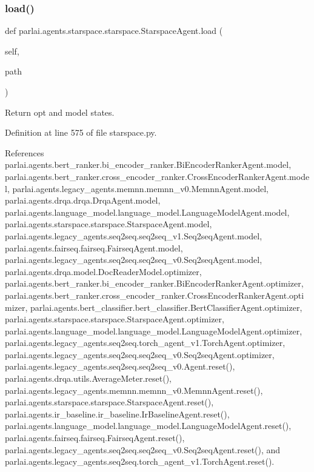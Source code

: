 \subsubsection{\texorpdfstring{load()}{load()}}
{\footnotesize\ttfamily def parlai.\+agents.\+starspace.\+starspace.\+Starspace\+Agent.\+load (\begin{DoxyParamCaption}\item[{}]{self,  }\item[{}]{path }\end{DoxyParamCaption})}

\begin{DoxyVerb}Return opt and model states.\end{DoxyVerb}
 

Definition at line 575 of file starspace.\+py.



References parlai.\+agents.\+bert\+\_\+ranker.\+bi\+\_\+encoder\+\_\+ranker.\+Bi\+Encoder\+Ranker\+Agent.\+model, parlai.\+agents.\+bert\+\_\+ranker.\+cross\+\_\+encoder\+\_\+ranker.\+Cross\+Encoder\+Ranker\+Agent.\+model, parlai.\+agents.\+legacy\+\_\+agents.\+memnn.\+memnn\+\_\+v0.\+Memnn\+Agent.\+model, parlai.\+agents.\+drqa.\+drqa.\+Drqa\+Agent.\+model, parlai.\+agents.\+language\+\_\+model.\+language\+\_\+model.\+Language\+Model\+Agent.\+model, parlai.\+agents.\+starspace.\+starspace.\+Starspace\+Agent.\+model, parlai.\+agents.\+legacy\+\_\+agents.\+seq2seq.\+seq2seq\+\_\+v1.\+Seq2seq\+Agent.\+model, parlai.\+agents.\+fairseq.\+fairseq.\+Fairseq\+Agent.\+model, parlai.\+agents.\+legacy\+\_\+agents.\+seq2seq.\+seq2seq\+\_\+v0.\+Seq2seq\+Agent.\+model, parlai.\+agents.\+drqa.\+model.\+Doc\+Reader\+Model.\+optimizer, parlai.\+agents.\+bert\+\_\+ranker.\+bi\+\_\+encoder\+\_\+ranker.\+Bi\+Encoder\+Ranker\+Agent.\+optimizer, parlai.\+agents.\+bert\+\_\+ranker.\+cross\+\_\+encoder\+\_\+ranker.\+Cross\+Encoder\+Ranker\+Agent.\+optimizer, parlai.\+agents.\+bert\+\_\+classifier.\+bert\+\_\+classifier.\+Bert\+Classifier\+Agent.\+optimizer, parlai.\+agents.\+starspace.\+starspace.\+Starspace\+Agent.\+optimizer, parlai.\+agents.\+language\+\_\+model.\+language\+\_\+model.\+Language\+Model\+Agent.\+optimizer, parlai.\+agents.\+legacy\+\_\+agents.\+seq2seq.\+torch\+\_\+agent\+\_\+v1.\+Torch\+Agent.\+optimizer, parlai.\+agents.\+legacy\+\_\+agents.\+seq2seq.\+seq2seq\+\_\+v0.\+Seq2seq\+Agent.\+optimizer, parlai.\+agents.\+legacy\+\_\+agents.\+seq2seq.\+seq2seq\+\_\+v0.\+Agent.\+reset(), parlai.\+agents.\+drqa.\+utils.\+Average\+Meter.\+reset(), parlai.\+agents.\+legacy\+\_\+agents.\+memnn.\+memnn\+\_\+v0.\+Memnn\+Agent.\+reset(), parlai.\+agents.\+starspace.\+starspace.\+Starspace\+Agent.\+reset(), parlai.\+agents.\+ir\+\_\+baseline.\+ir\+\_\+baseline.\+Ir\+Baseline\+Agent.\+reset(), parlai.\+agents.\+language\+\_\+model.\+language\+\_\+model.\+Language\+Model\+Agent.\+reset(), parlai.\+agents.\+fairseq.\+fairseq.\+Fairseq\+Agent.\+reset(), parlai.\+agents.\+legacy\+\_\+agents.\+seq2seq.\+seq2seq\+\_\+v0.\+Seq2seq\+Agent.\+reset(), and parlai.\+agents.\+legacy\+\_\+agents.\+seq2seq.\+torch\+\_\+agent\+\_\+v1.\+Torch\+Agent.\+reset().



